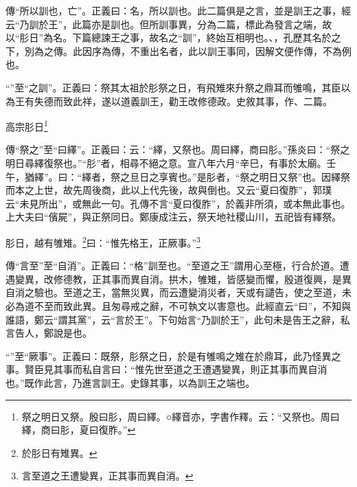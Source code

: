 {\noindent\zhuan{}\fzbyks 傳“所以訓也，亡”。正義曰：名，所以訓也。此二篇俱是之言，並是訓王之事，經云“乃訓於王”，此篇亦是訓也。但所訓事異，分為二篇，標此為發言之端，故以“肜日”為名。下篇總諫王之事，故名之“訓”，終始互相明也。、，孔歷其名於之下，別為之傳。此因序為傳，不重出名者，此以訓王事同，因解文便作傳，不為例也。 \par}

{\noindent\shu{}\fzkt “”至“之訓”。正義曰：祭其太祖於肜祭之日，有飛雉來升祭之鼎耳而雊鳴，其臣以為王有失德而致此祥，遂以道義訓王，勸王改修德政。史敘其事，作、二篇。 \par}

高宗肜日\footnote{祭之明日又祭。殷曰肜，周曰繹。○繹音亦，字書作釋。云：“又祭也。周曰繹，商曰肜，夏曰復胙。”}

{\noindent\zhuan{}\fzbyks 傳“祭之”至“曰繹”。正義曰：云：“繹，又祭也。周曰繹，商曰肜。”孫炎曰：“祭之明日尋繹復祭也。”“肜”者，相尋不絕之意。宣八年六月“辛巳，有事於太廟。壬午，猶繹”。曰：“繹者，祭之旦日之享賓也。”是肜者，“祭之明日又祭”也。因繹祭而本之上世，故先周後商，此以上代先後，故與倒也。又云“夏曰復胙”，郭璞云“未見所出”，或無此一句。孔傳不言“夏曰復胙”，於義非所須，或本無此事也。上大夫曰“儐屍”，與正祭同日。鄭康成注云，祭天地社稷山川，五祀皆有繹祭。 \par}

肜日，越有雊雉。\footnote{於肜日有雉異。}曰：“惟先格王，正厥事。”\footnote{言至道之王遭變異，正其事而異自消。}


{\noindent\zhuan{}\fzbyks 傳“言至”至“自消”。正義曰：“格”訓至也。“至道之王”謂用心至極，行合於道。遭遇變異，改修德教，正其事而異自消。拱木，雊雉，皆感變而懼，殷道復興，是異自消之驗也。至道之王，當無災異，而云遭變消災者，天或有譴告，使之至道，未必為道不至而致此異。且匆尋戒之辭，不可執文以害意也。此經直云“曰”，不知與誰語，鄭云“謂其黨”，云“言於王”。下句始言“乃訓於王”，此句未是告王之辭，私言告人，鄭說是也。 \par}

{\noindent\shu{}\fzkt “”至“厥事”。正義曰：既祭，肜祭之日，於是有雊鳴之雉在於鼎耳，此乃怪異之事。賢臣見其事而私自言曰：“惟先世至道之王遭遇變異，則正其事而異自消也。”既作此言，乃進言訓王。史錄其事，以為訓王之端也。 \par}

